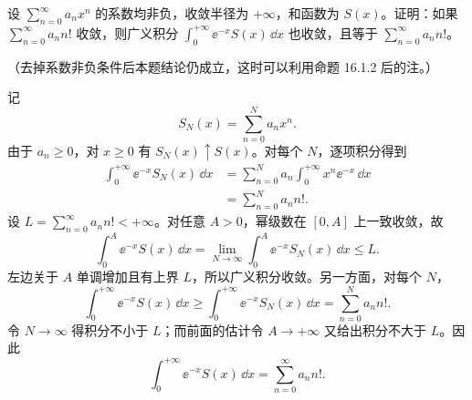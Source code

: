 \begin{xexercise}[2]
设 $\sum_{n=0}^{\infty}a_nx^n$ 的系数均非负，收敛半径为 $+\infty$，和函数为 $S(x)$。证明：如果 $\sum_{n=0}^{\infty}a_nn!$ 收敛，则广义积分 $\int_0^{+\infty}\ee^{-x}S(x)\,\dd x$ 也收敛，且等于 $\sum_{n=0}^{\infty}a_nn!$。

（去掉系数非负条件后本题结论仍成立，这时可以利用命题 16.1.2 后的注。）
\end{xexercise}
\begin{xsolution}
记
\[
  S_N(x)=\sum_{n=0}^N a_nx^n.
\]
由于 $a_n\geqslant0$，对 $x\geqslant0$ 有 $S_N(x)\uparrow S(x)$。对每个 $N$，逐项积分得到
\[
\begin{aligned}
  \int_0^{+\infty}\ee^{-x}S_N(x)\,\dd x
  &=\sum_{n=0}^Na_n\int_0^{+\infty}x^n\ee^{-x}\,\dd x\\
  &=\sum_{n=0}^Na_nn!.
\end{aligned}
\]
设 $L=\sum_{n=0}^{\infty}a_nn!<+\infty$。对任意 $A>0$，幂级数在 $[0,A]$ 上一致收敛，故
\[
  \int_0^A\ee^{-x}S(x)\,\dd x
  =\lim_{N\to\infty}\int_0^A\ee^{-x}S_N(x)\,\dd x
  \leqslant L.
\]
左边关于 $A$ 单调增加且有上界 $L$，所以广义积分收敛。另一方面，对每个 $N$，
\[
  \int_0^{+\infty}\ee^{-x}S(x)\,\dd x
  \geqslant\int_0^{+\infty}\ee^{-x}S_N(x)\,\dd x
  =\sum_{n=0}^Na_nn!.
\]
令 $N\to\infty$ 得积分不小于 $L$；而前面的估计令 $A\to+\infty$ 又给出积分不大于 $L$。因此
\[
  \int_0^{+\infty}\ee^{-x}S(x)\,\dd x
  =\sum_{n=0}^{\infty}a_nn!.
\]
\end{xsolution}


